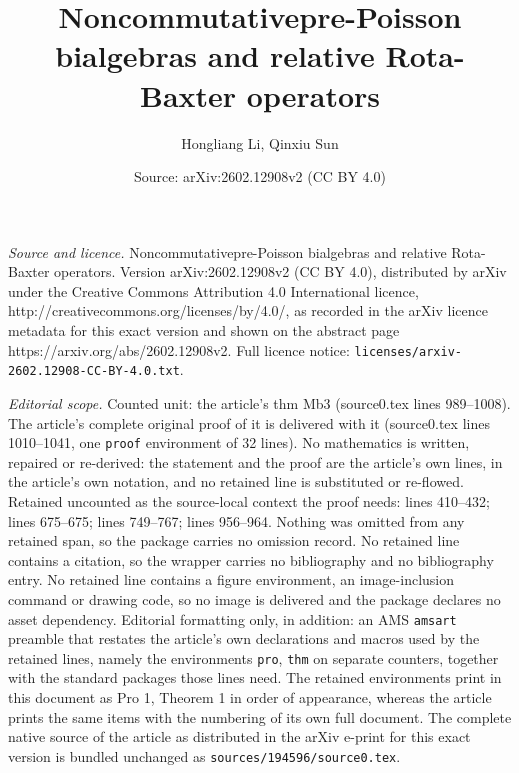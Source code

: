 \documentclass[10pt,a4paper]{amsart}
\title{Noncommutativepre-Poisson bialgebras and relative Rota-Baxter operators}
\author{Hongliang Li, Qinxiu Sun}
\date{Source: arXiv:2602.12908v2 (CC BY 4.0)}
\begin{document}
\maketitle

\noindent\emph{Source and licence.} Noncommutativepre-Poisson bialgebras and relative Rota-Baxter operators. Version arXiv:2602.12908v2 (CC BY 4.0), distributed by arXiv under the Creative Commons Attribution 4.0 International licence, http://creativecommons.org/licenses/by/4.0/, as recorded in the arXiv licence metadata for this exact version and shown on the abstract page https://arxiv.org/abs/2602.12908v2. Full licence notice: \texttt{licenses/arxiv-2602.12908-CC-BY-4.0.txt}.\par\smallskip

\noindent\textit{Editorial scope.} Counted unit: the article's thm Mb3 (source0.tex lines 989--1008). The article's complete original proof of it is delivered with it (source0.tex lines 1010--1041, one \texttt{proof} environment of 32 lines). No mathematics is written, repaired or re-derived: the statement and the proof are the article's own lines, in the article's own notation, and no retained line is substituted or re-flowed.  Retained uncounted as the source-local context the proof needs: lines 410--432; lines 675--675; lines 749--767; lines 956--964.  Nothing was omitted from any retained span, so the package carries no omission record.  No retained line contains a citation, so the wrapper carries no bibliography and no bibliography entry.  No retained line contains a figure environment, an image-inclusion command or drawing code, so no image is delivered and the package declares no asset dependency.  Editorial formatting only, in addition: an AMS \texttt{amsart} preamble that restates the article's own declarations and macros used by the retained lines, namely the environments \texttt{pro}, \texttt{thm} on separate counters, together with the standard packages those lines need.  The retained environments print in this document as Pro 1, Theorem 1 in order of appearance, whereas the article prints the same items with the numbering of its own full document.  The complete native source of the article as distributed in the arXiv e-print for this exact version is bundled unchanged as \texttt{sources/194596/source0.tex}.
\end{document}
